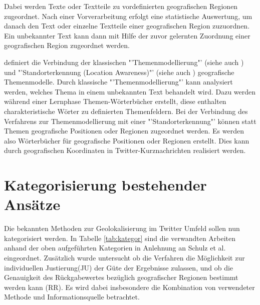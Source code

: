 			Dabei werden Texte oder Textteile zu vordefinierten geografischen Regionen zugeordnet. 
			Nach einer Vorverarbeitung erfolgt eine statistische Auswertung, um danach den Text oder einzelne Textteile einer geografischen Region zuzuordnen. 
			Ein unbekannter Text kann dann mit Hilfe der zuvor gelernten Zuordnung einer geografischen Region zugeordnet werden.
			
			\cite{Priedhorsky2013} definiert die Verbindung der klassischen "'Themenmodellierung"' (siehe auch \cite{Blei2012}) und "'Standorterkennung (Location Awareness)"' (siehe auch \cite{Wang2007}) geografische Themenmodelle. 
			Durch klassische "'Themenmodellierung"' kann analysiert werden, welches Thema in einem unbekannten Text behandelt wird. 
			Dazu werden während einer Lernphase Themen-Wörterbücher erstellt, diese enthalten charakteristische Wörter zu definierten Themenfeldern. \cite{Blei2012} 
			Bei der Verbindung des Verfahrens zur Themenmodellierung mit einer "'Standorterkennung"' können statt Themen geografische Positionen oder Regionen zugeordnet werden.
			Es werden also Wörterbücher für geografische Positionen oder Regionen erstellt. 
			Dies kann durch geografischen Koordinaten in Twitter-Kurznachrichten realisiert werden. 
		

	\section{Kategorisierung bestehender Ansätze} 

		Die bekannten Methoden zur Geolokalisierung im Twitter Umfeld sollen nun kategorisiert werden. 
		In Tabelle \ref{tab:kategor} sind die verwandten Arbeiten anhand der oben aufgeführten Kategorien in Anlehnung an Schulz et al. \cite{Schulz2013} eingeordnet.
		Zusätzlich wurde untersucht ob die Verfahren die Möglichkeit zur individuellen Justierung(JU) der Güte der Ergebnisse zulassen, und ob die Genauigkeit des Rückgabewertes bezüglich geografischer Regionen bestimmt werden kann (RR).
		Es wird dabei insbesondere die Kombination von verwendeter Methode und Informationsquelle betrachtet.
		

